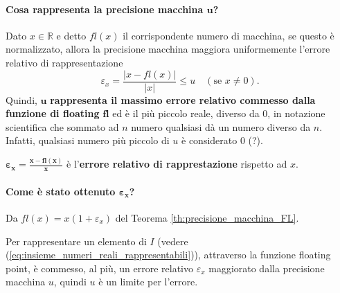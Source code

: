 \paragraph{Cosa rappresenta la precisione macchina $\boldsymbol{u}$?}
Dato $x\in\mathbb R$ e detto $fl(x)$ il corrispondente numero di macchina, se questo è normalizzato, allora la precisione macchina \gls{maggiora uniformemente} l'errore relativo di rappresentazione
\begin{equation*}
	\varepsilon_x = \frac{|x-fl(x)|}{|x|}\leq u\quad (\text{se } x\neq 0).
\end{equation*}
Quindi, $\boldsymbol u$ \textbf{rappresenta il massimo errore relativo commesso dalla funzione di floating} $\boldsymbol{fl}$ ed è il più piccolo reale, diverso da 0, in notazione scientifica che sommato ad $n$ numero qualsiasi dà un numero diverso da $n$. Infatti, qualsiasi numero più piccolo di $u$ è considerato 0 (?).

\addtocounter{footnote}{-2}



\begin{definition}
	$\boldsymbol{\varepsilon_x}=\boldsymbol{\frac{x - fl(x)}{x}}$ è l'\textbf{errore relativo di rapprestazione} rispetto ad $x$.
\end{definition}
\paragraph{Come è stato ottenuto $\boldsymbol{\varepsilon_x}$?}{Da $fl(x)=x(1+\varepsilon_x)$ del Teorema \ref{th:precisione_macchina_FL}.}

Per rappresentare un elemento di $I$ (vedere (\ref{eq:insieme_numeri_reali_rappresentabili})), attraverso la funzione floating point, è commesso, al più, un errore relativo $\varepsilon_x$ maggiorato dalla precisione macchina $u$, quindi $u$ è un limite per l'errore.

